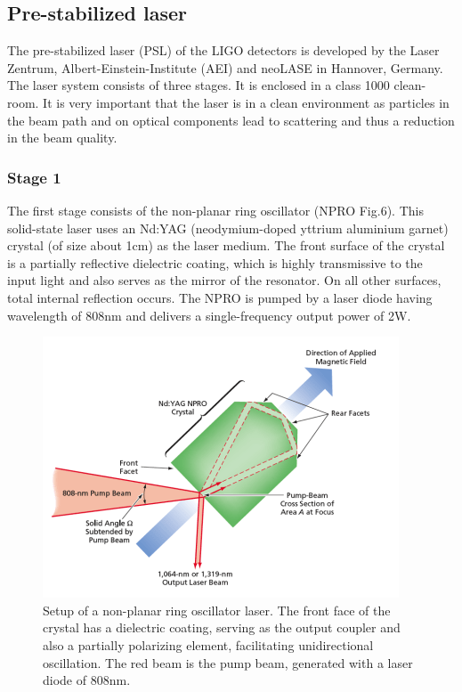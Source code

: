 \documentclass[conference]{IEEEtran}
\begin{document}
\subsection{Pre-stabilized laser}
The pre-stabilized laser (PSL) of the LIGO detectors is developed by the Laser Zentrum, Albert-Einstein-Institute (AEI) and neoLASE in Hannover, Germany. The laser system consists of three stages. It is enclosed in a class 1000 clean-room.  It is very important that the laser is in a clean environment as particles in the beam path and on optical components lead to scattering and thus a reduction in the beam quality. 

\subsubsection{Stage 1}
The first stage consists of the non-planar ring oscillator (NPRO Fig.6). This solid-state laser uses an Nd:YAG (neodymium-doped yttrium aluminium garnet) crystal (of size about 1cm) as the laser medium. The front surface of the crystal is a partially reflective dielectric coating, which is highly transmissive to the input light and also serves as the mirror of the resonator. On all other surfaces, total internal reflection occurs. The NPRO is pumped by a laser diode having wavelength of 808nm and delivers a single-frequency output power of 2W\cite{phdthesis,article1,Pold:2014qzc}.  

\begin{figure}[htbp]
\centerline{\includegraphics[scale=0.50]{NPO-43782_fig1.png}}
\caption{Setup of a non-planar ring oscillator laser. The front face of the crystal has a dielectric coating, serving as the output coupler and also a partially polarizing element, facilitating unidirectional oscillation. The red beam is the pump beam, generated with a laser diode of 808nm\cite{Liu:2007}.}

\end{figure}
\end{document}
